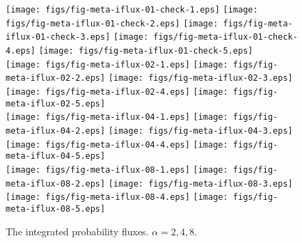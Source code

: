 \documentclass[aip,jcp,a4paper,reprint,onecolumn]{revtex4-1}
\begin{document}
\begin{figure}
  \centering
  \texttt{[image: figs/fig-meta-iflux-01-check-1.eps]}
  \texttt{[image: figs/fig-meta-iflux-01-check-2.eps]}
  \texttt{[image: figs/fig-meta-iflux-01-check-3.eps]}
  \texttt{[image: figs/fig-meta-iflux-01-check-4.eps]}
  \texttt{[image: figs/fig-meta-iflux-01-check-5.eps]}\\
  \texttt{[image: figs/fig-meta-iflux-02-1.eps]}
  \texttt{[image: figs/fig-meta-iflux-02-2.eps]}
  \texttt{[image: figs/fig-meta-iflux-02-3.eps]}
  \texttt{[image: figs/fig-meta-iflux-02-4.eps]}
  \texttt{[image: figs/fig-meta-iflux-02-5.eps]}\\
  \texttt{[image: figs/fig-meta-iflux-04-1.eps]}
  \texttt{[image: figs/fig-meta-iflux-04-2.eps]}
  \texttt{[image: figs/fig-meta-iflux-04-3.eps]}
  \texttt{[image: figs/fig-meta-iflux-04-4.eps]}
  \texttt{[image: figs/fig-meta-iflux-04-5.eps]}\\
  \texttt{[image: figs/fig-meta-iflux-08-1.eps]}
  \texttt{[image: figs/fig-meta-iflux-08-2.eps]}
  \texttt{[image: figs/fig-meta-iflux-08-3.eps]}
  \texttt{[image: figs/fig-meta-iflux-08-4.eps]}
  \texttt{[image: figs/fig-meta-iflux-08-5.eps]}\\
  \caption{The integrated probability fluxes. $\alpha = 2,4,8$.}
  \label{fig:tmp3}
\end{figure}
\end{document}

